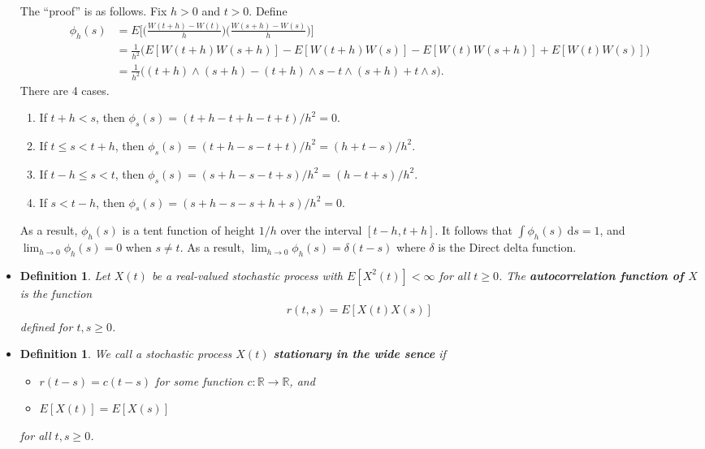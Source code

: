\documentclass[10pt]{article}
\newtheorem{definition}[lemma]{Definition}
\newcommand{\dee}{\mathrm{d}}
\newcommand{\Real}{\mathbb{R}}
\begin{document}
\begin{itemize}
  The ``proof'' is as follows. Fix $h > 0$ and $t > 0$. Define
  \begin{align*}
    \phi_h(s) 
    &= E\bigg[ \bigg( \frac{W(t+h) - W(t)}{h} \bigg) \bigg( \frac{W(s+h) - W(s)}{h} \bigg) \bigg] \\
    &= \frac{1}{h^2}\Big( E[W(t+h)W(s+h)] - E[W(t+h)W(s)] - E[W(t)W(s+h)] + E[W(t)W(s)] \Big) \\
    &= \frac{1}{h^2}\Big( (t+h) \wedge (s+h) - (t+h) \wedge s - t \wedge (s+h) + t \wedge s \Big).    
  \end{align*}
  There are 4 cases.
  \begin{enumerate}
    \item If $t+h < s$, then $\phi_s(s) = (t+h - t+h - t + t)/h^2 = 0$.
    \item If $t \leq s < t+h$, then $\phi_s(s) = (t+h - s - t + t)/h^2 = (h+t-s)/h^2$.
    \item If $t-h \leq s < t$, then $\phi_s(s) = (s+h - s - t + s)/h^2 = (h-t+s)/h^2$.
    \item If $s < t-h$, then $\phi_s(s) = (s+h - s - s+h + s)/h^2 = 0$.
  \end{enumerate}
  As a result, $\phi_h(s)$ is a tent function of height $1/h$ over the interval $[t-h,t+h]$. It follows that $\int \phi_h(s)\ \dee s = 1$, and $\lim_{h \rightarrow 0} \phi_h(s) = 0$ when $s \neq t$. As a result, $\lim_{h \rightarrow 0} \phi_h(s) = \delta(t-s)$ where $\delta$ is the Direct delta function.

  \item \begin{definition}
    Let $X(t)$ be a real-valued stochastic process with $E[X^2(t)] < \infty$ for all $t \geq 0$. The {\bf autocorrelation function of $X$} is the function
    \begin{align*}
      r(t,s) = E[X(t)X(s)]
    \end{align*}
    defined for $t, s \geq 0$.
  \end{definition}

  \item \begin{definition}
    We call a stochastic process $X(t)$ {\bf stationary in the wide sence} if
    \begin{itemize}
      \item $r(t-s) = c(t-s)$ for some function $c: \Real \rightarrow \Real$, and
      \item $E[X(t)] = E[X(s)]$
    \end{itemize}
    for all $t, s \geq 0$.
  \end{definition}


\end{itemize}
\end{document}
